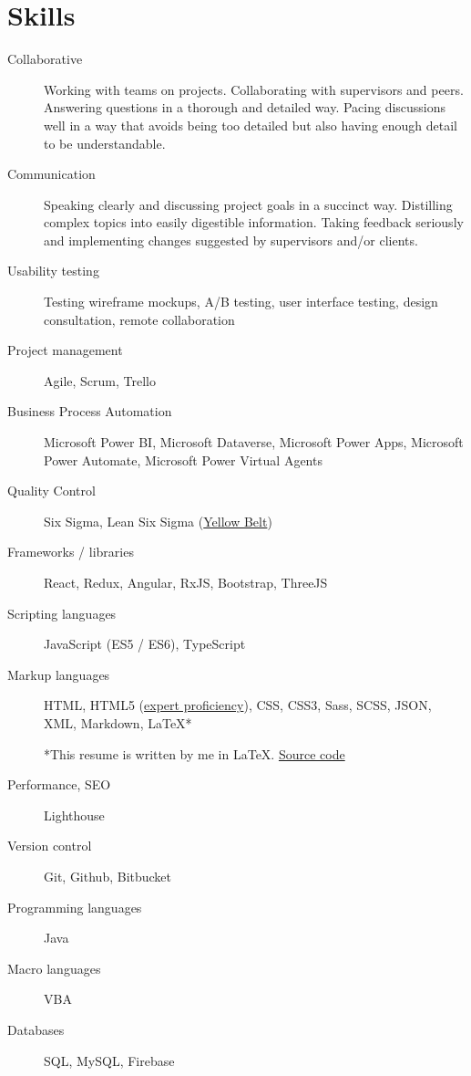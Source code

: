 \documentclass{article}
\begin{document}
\vspace{-1em}
\section*{Skills}\vspace{-0.5em}

\begin{description}
  \item [Collaborative] Working with teams on projects. Collaborating with supervisors and peers. Answering questions in a thorough and detailed way. Pacing discussions well in a way that avoids being too detailed but also having enough detail to be understandable.
  \item [Communication] Speaking clearly and discussing project goals in a succinct way. Distilling complex topics into easily digestible information. Taking feedback seriously and implementing changes suggested by supervisors and/or clients.
  \item [Usability testing] Testing wireframe mockups, A/B testing, user interface testing, design consultation, remote collaboration
  \item [Project management] Agile, Scrum, Trello
  \item [Business Process Automation] Microsoft Power BI, Microsoft Dataverse, Microsoft Power Apps, Microsoft Power Automate, Microsoft Power Virtual Agents
  \item [Quality Control] Six Sigma, Lean Six Sigma (\href{https://api.badgr.io/public/assertions/KE5P9gfoQ7S3-hpvZP4PIQ}{Yellow Belt})
  \item [Frameworks / libraries] React, Redux, Angular, RxJS, Bootstrap, ThreeJS
  \item [Scripting languages] JavaScript (ES5 / ES6), TypeScript
  \item [Markup languages] HTML, HTML5 (\href{https://app.pluralsight.com/profile/alexander-koik-cesto}{expert proficiency}), CSS, CSS3, Sass, SCSS, JSON, XML, Markdown, LaTeX*
  \item []*This resume is written by me in LaTeX. \href{https://github.com/sirkoik/CurriculumVitae/blob/master/source/main/resume.tex}{Source code}
  \item [Performance, SEO] Lighthouse
  \item [Version control] Git, Github, Bitbucket
  \item [Programming languages] Java
  \item [Macro languages] VBA
  \item [Databases] SQL, MySQL, Firebase

\end{description}
\end{document}
